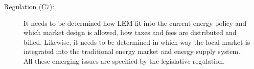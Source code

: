 \begin{description}
    \item[Regulation (C7):] It needs to be determined how LEM 
     fit into the current energy policy and which market design is allowed, how 
     taxes and fees are distributed and billed. Likewise, it needs to 
     be determined in which way the local market is integrated into the traditional
     energy market and energy supply system.
     All these emerging issues are specified by the legislative regulation.
    
\end{description}


\clearpage